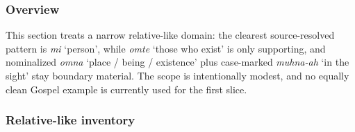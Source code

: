\documentclass[
  11pt,
  a4paper,
]{article}
\newcommand{\tdim}[1]{\textit{#1}}
\newcommand{\glossquote}[1]{`#1'}
\begin{document}
\subsubsection{Overview}\label{overview}

This section treats a narrow relative-like domain: the clearest
source-resolved pattern is \tdim{mi} \glossquote{person}, while
\tdim{omte} \glossquote{those who exist} is only supporting, and
nominalized \tdim{omna} \glossquote{place / being / existence} plus
case-marked \tdim{muhna-ah} \glossquote{in the sight} stay boundary
material. The scope is intentionally modest, and no equally clean Gospel
example is currently used for the first slice.

\subsubsection{Relative-like inventory}\label{relative-like-inventory}
\end{document}
